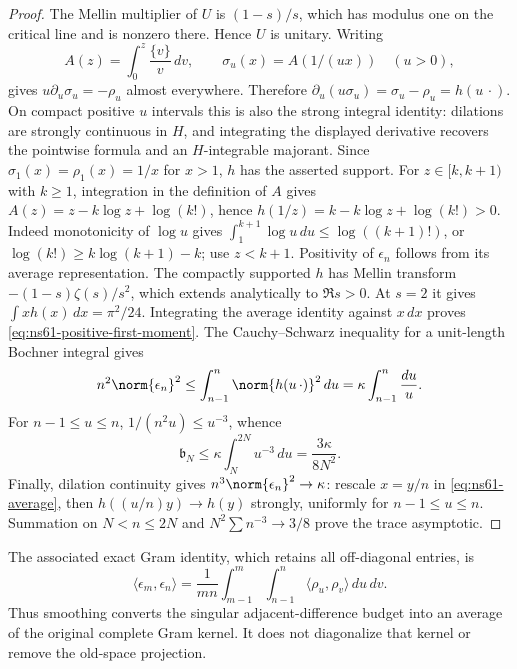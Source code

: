 \begin{proof}
The Mellin multiplier of $U$ is $(1-s)/s$, which has modulus one on
the critical line and is nonzero there. Hence $U$ is unitary.
Writing
\[
 A(z)=\int_0^z\frac{\{v\}}v\,dv,
 \qquad \sigma_u(x)=A(1/(ux))\quad(u>0),
\]
gives $u\partial_u\sigma_u=-\rho_u$ almost everywhere. Therefore
$\partial_u(u\sigma_u)=\sigma_u-\rho_u=h(u\,\cdot)$.
On compact positive $u$ intervals this is also the strong integral
identity: dilations are strongly continuous in $H$, and integrating
the displayed derivative recovers the pointwise formula and an
$H$-integrable majorant. Since $\sigma_1(x)=\rho_1(x)=1/x$ for
$x>1$, $h$ has the asserted support.
For $z\in[k,k+1)$ with $k\geq1$, integration in the definition of
$A$ gives $A(z)=z-k\log z+\log(k!)$, hence
$h(1/z)=k-k\log z+\log(k!)>0$.
Indeed monotonicity of $\log u$ gives
$\int_1^{k+1}\log u\,du\leq\log((k+1)!)$, or
$\log(k!)\geq k\log(k+1)-k$; use $z<k+1$.
Positivity of $\epsilon_n$ follows from its average representation.
The compactly supported $h$ has Mellin transform
$-(1-s)\zeta(s)/s^2$, which extends analytically to $\Re s>0$.
At $s=2$ it gives $\int xh(x)\,dx=\pi^2/24$. Integrating the
average identity against $x\,dx$ proves
\eqref{eq:ns61-positive-first-moment}.
The Cauchy--Schwarz inequality for a unit-length Bochner integral gives
\[
 n^2\norm{\epsilon_n}^2\leq
 \int_{n-1}^{n}\norm{h(u\,\cdot)}^2\,du
 =\kappa\int_{n-1}^{n}\frac{du}{u}.
\]
For $n-1\leq u\leq n$, $1/(n^2u)\leq u^{-3}$, whence
\[
 \mathfrak b_N\leq\kappa\int_N^{2N}u^{-3}\,du
       =\frac{3\kappa}{8N^2}.
\]
Finally, dilation continuity gives
$n^3\norm{\epsilon_n}^2\to\kappa$: rescale $x=y/n$ in
\eqref{eq:ns61-average}, then $h((u/n)y)\to h(y)$ strongly,
uniformly for $n-1\leq u\leq n$. Summation on $N<n\leq2N$
and $N^2\sum n^{-3}\to3/8$ prove the trace asymptotic.
\end{proof}

The associated exact Gram identity, which retains all off-diagonal
entries, is
\begin{equation}
 \langle\epsilon_m,\epsilon_n\rangle
 =\frac1{mn}\int_{m-1}^{m}\int_{n-1}^{n}
        \langle\rho_u,\rho_v\rangle\,du\,dv.
 \label{eq:ns61-averaged-full-gram}
\end{equation}
Thus smoothing converts the singular adjacent-difference budget into
an average of the original complete Gram kernel. It does not diagonalize
that kernel or remove the old-space projection.

